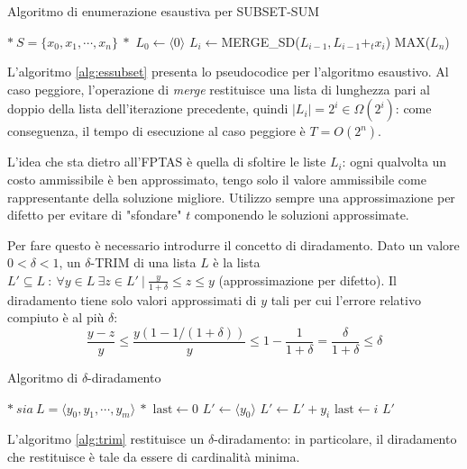 \begin{algorithm}
\caption{Algoritmo di enumerazione esaustiva per SUBSET-SUM}
\label{alg:essubset}
\begin{algorithmic}
	\State $*\ S=\{ x_0, x_1, \cdots , x_n \}\ *$
	\State $L_0 \gets \langle 0 \rangle$
		\State $L_i \gets $MERGE\_SD($L_{i-1}, L_{i-1} +_t x_i$)
	\EndFor
	\State \Return MAX($L_n$)
\EndFunction
\end{algorithmic}
\end{algorithm}

L'algoritmo \ref{alg:essubset} presenta lo pseudocodice per l'algoritmo esaustivo. Al caso peggiore, l'operazione di \textit{merge} restituisce una lista di lunghezza pari al doppio della lista dell'iterazione precedente, quindi $|L_i|=2^i\in \Omega (2^i)$: come conseguenza, il tempo di esecuzione al caso peggiore è $T=O(2^n)$.

L'idea che sta dietro all'FPTAS è quella di sfoltire le liste $L_i$: ogni qualvolta un costo ammissibile è ben approssimato, tengo solo il valore ammissibile come rappresentante della soluzione migliore. Utilizzo sempre una approssimazione per difetto per evitare di "sfondare" $t$ componendo le soluzioni approssimate.

Per fare questo è necessario introdurre il concetto di diradamento. Dato un valore $0 < \delta < 1$, un $\delta$-TRIM di una lista $L$ è la lista $L'\subseteq L\ :\ \forall y\in L\ \exists z\in L'\ |\ \frac{y}{1+\delta} \leq z \leq y$ (approssimazione per difetto). Il diradamento tiene solo valori approssimati di $y$ tali per cui l'errore relativo compiuto è al più $\delta$:
\[
\frac{y-z}{y} \leq \frac{y(1-1/(1+\delta))}{y} \leq 1 - \frac{1}{1+\delta} = \frac{\delta}{1+\delta} \leq \delta
\]

\begin{algorithm}
\caption{Algoritmo di $\delta$-diradamento}
\label{alg:trim}
\begin{algorithmic}
	\State $*\ sia\ L=\langle y_0, y_1, \cdots , y_m \rangle\ *$
	\State $\text{last} \gets 0$
	\State $L' \gets \langle y_0 \rangle$
			\State $L' \gets L'+y_i$
			\State $\text{last} \gets i$
		\EndIf
	\EndFor
	\State \Return $L'$
\EndFunction
\end{algorithmic}
\end{algorithm}

L'algoritmo \ref{alg:trim} restituisce un $\delta$-diradamento: in particolare, il diradamento che restituisce è tale da essere di cardinalità minima.

